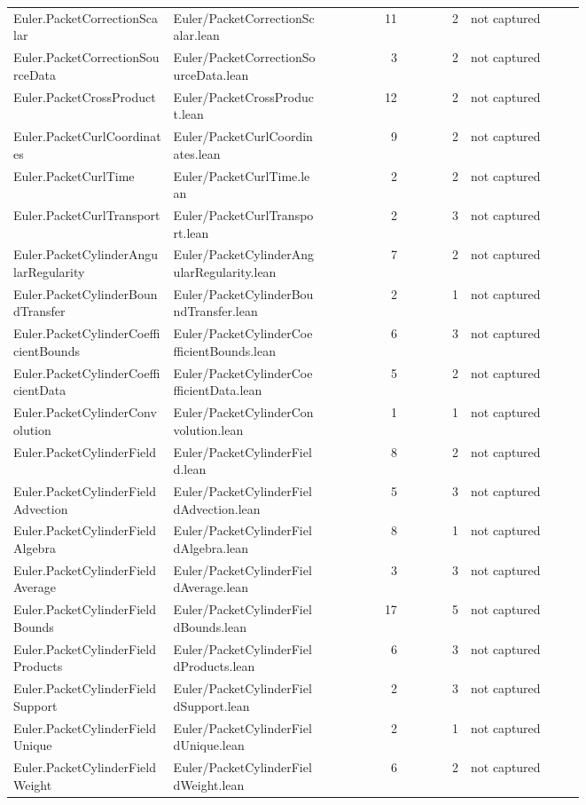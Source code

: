 \documentclass[10pt]{article}
\begin{document}
\begin{longtable}{p{0.28\linewidth}p{0.27\linewidth}r r p{0.20\linewidth}}
Euler.PacketCorrectionScalar & Euler/PacketCorrectionScalar.lean & 11 & 2 & not captured\\
Euler.PacketCorrectionSourceData & Euler/PacketCorrectionSourceData.lean & 3 & 2 & not captured\\
Euler.PacketCrossProduct & Euler/PacketCrossProduct.lean & 12 & 2 & not captured\\
Euler.PacketCurlCoordinates & Euler/PacketCurlCoordinates.lean & 9 & 2 & not captured\\
Euler.PacketCurlTime & Euler/PacketCurlTime.lean & 2 & 2 & not captured\\
Euler.PacketCurlTransport & Euler/PacketCurlTransport.lean & 2 & 3 & not captured\\
Euler.PacketCylinderAngularRegularity & Euler/PacketCylinderAngularRegularity.lean & 7 & 2 & not captured\\
Euler.PacketCylinderBoundTransfer & Euler/PacketCylinderBoundTransfer.lean & 2 & 1 & not captured\\
Euler.PacketCylinderCoefficientBounds & Euler/PacketCylinderCoefficientBounds.lean & 6 & 3 & not captured\\
Euler.PacketCylinderCoefficientData & Euler/PacketCylinderCoefficientData.lean & 5 & 2 & not captured\\
Euler.PacketCylinderConvolution & Euler/PacketCylinderConvolution.lean & 1 & 1 & not captured\\
Euler.PacketCylinderField & Euler/PacketCylinderField.lean & 8 & 2 & not captured\\
Euler.PacketCylinderFieldAdvection & Euler/PacketCylinderFieldAdvection.lean & 5 & 3 & not captured\\
Euler.PacketCylinderFieldAlgebra & Euler/PacketCylinderFieldAlgebra.lean & 8 & 1 & not captured\\
Euler.PacketCylinderFieldAverage & Euler/PacketCylinderFieldAverage.lean & 3 & 3 & not captured\\
Euler.PacketCylinderFieldBounds & Euler/PacketCylinderFieldBounds.lean & 17 & 5 & not captured\\
Euler.PacketCylinderFieldProducts & Euler/PacketCylinderFieldProducts.lean & 6 & 3 & not captured\\
Euler.PacketCylinderFieldSupport & Euler/PacketCylinderFieldSupport.lean & 2 & 3 & not captured\\
Euler.PacketCylinderFieldUnique & Euler/PacketCylinderFieldUnique.lean & 2 & 1 & not captured\\
Euler.PacketCylinderFieldWeight & Euler/PacketCylinderFieldWeight.lean & 6 & 2 & not captured\\

\end{longtable}
\end{document}
